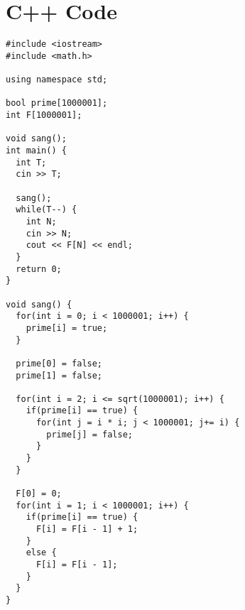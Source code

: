 \documentclass{article}
\begin{document}
\section*{C++ Code}

\begin{tcolorbox}[colback=blue!10!white,colframe=blue!50!black,title=\textbf{C++ Code}]
\begin{lstlisting}
#include <iostream>
#include <math.h>

using namespace std;

bool prime[1000001];
int F[1000001];

void sang();
int main() {
  int T;
  cin >> T;

  sang();
  while(T--) {
    int N;
    cin >> N;
    cout << F[N] << endl;
  }
  return 0;
}

void sang() {
  for(int i = 0; i < 1000001; i++) {
    prime[i] = true;
  }

  prime[0] = false;
  prime[1] = false;

  for(int i = 2; i <= sqrt(1000001); i++) {
    if(prime[i] == true) {
      for(int j = i * i; j < 1000001; j+= i) {
        prime[j] = false;
      }
    }
  }

  F[0] = 0;
  for(int i = 1; i < 1000001; i++) {
    if(prime[i] == true) {
      F[i] = F[i - 1] + 1;
    }
    else {
      F[i] = F[i - 1];
    }
  }
}
\end{lstlisting}
\end{tcolorbox}
\end{document}
